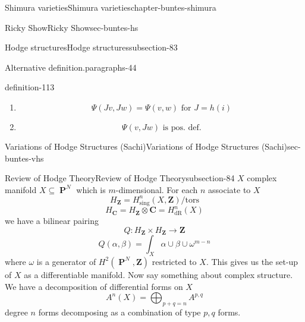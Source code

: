 \documentclass[oneside,10pt,]{book}
\numberwithin{equation}{section}
\newcommand{\ZZ}{\mathbf{Z}}
\newcommand{\CC}{\mathbf{C}}
\newcommand{\dR}{\mathrm{dR}}
\newcommand{\tors}{\mathrm{tors}}
\DeclareMathOperator{\PP}{\mathbf{P}}
\begin{document}
\begin{chapterptx}{Shimura varieties}{}{Shimura varieties}{}{}{chapter-buntes-shimura}
\begin{sectionptx}{Ricky Show}{}{Ricky Show}{}{}{sec-buntes-hs}
\begin{subsectionptx}{Hodge structures}{}{Hodge structures}{}{}{subsection-83}
\begin{paragraphs}{Alternative definition.}{paragraphs-44}
\begin{definition}{}{definition-113}
\begin{enumerate}
\item\hypertarget{li-286}{}%
\begin{equation*}
\Psi (Jv,Jw) =  \Psi(v,w) \text{ for } J = h(i)
\end{equation*}
%
\item\hypertarget{li-287}{}%
\begin{equation*}
\Psi(v,Jw) \text{ is pos. def.}
\end{equation*}
%
\end{enumerate}
%
\end{definition}
\end{paragraphs}%
\end{subsectionptx}
\end{sectionptx}
%
%
\typeout{************************************************}
\typeout{************************************************}
%
\begin{sectionptx}{Variations of Hodge Structures (Sachi)}{}{Variations of Hodge Structures (Sachi)}{}{}{sec-buntes-vhs}
%
%
\typeout{************************************************}
\typeout{************************************************}
%
\begin{subsectionptx}{Review of Hodge Theory}{}{Review of Hodge Theory}{}{}{subsection-84}
\hypertarget{p-1152}{}%
\(X\) complex manifold \(X\subseteq \PP^N\) which is \(m\)-dimensional. For each \(n\) associate to \(X\)%
\begin{equation*}
H_\ZZ = H^n_{\mathrm{sing}}(X, \ZZ) / \tors
\end{equation*}
%
\begin{equation*}
H_\CC = H_\ZZ \otimes \CC = H^n_\dR(X)
\end{equation*}
we have a bilinear pairing%
\begin{equation*}
Q\colon H_\ZZ \times H_\ZZ \to \ZZ
\end{equation*}
%
\begin{equation*}
Q(\alpha,\beta) = \int_X \alpha \cup \beta \cup \omega^{m-n}
\end{equation*}
where \(\omega\) is a generator of \(H^2( \PP^N , \ZZ)\) restricted to \(X\). This gives us the set-up of \(X\) as a differentiable manifold. Now say something about complex structure. We have a decomposition of differential forms on \(X\)%
\begin{equation*}
A^n(X) = \bigoplus_{p+q  =n} A^{p,q}
\end{equation*}
degree \(n\) forms decomposing as a combination of type \(p,q\) forms.%

\end{subsectionptx}
\end{sectionptx}
\end{chapterptx}
\end{document}
